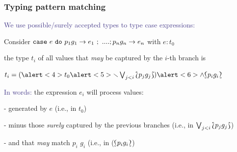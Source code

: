 \begin{frame}[fragile]
\frametitle{Typing pattern matching}

\vspace{.7pt}

\textcolor{darkslateblue}{We use possible/surely accepted types to type case expressions:}

\medskip

Consider \textcolor{typeBlue}{$\texttt{case}\,\, e \,\, \texttt{do} \,\, p_1g_1\to e_1 \,\, ; \,\, ....;p_ng_n\to e_n$} with \textcolor{typeBlue}{$e:t_0$}

\medskip
\pause
the type \textcolor{typeBlue}{$t_i$} of all values that \emph{may} be captured by the
$i$-th branch is

\centerline{\textcolor{typeBlue}{$t_i=(\alert<4>{t_0}\alert<5>{\setminus\bigvee_{j<i}\sAccType{p_jg_j}})\alert<6>{\wedge\pAccType{p_ig_i}}$}}

\medskip

\bigskip
\pause
\textcolor{darkslateblue}{In words:}
the expression \textcolor{typeBlue}{$e_i$} will process  values:

\pause
- generated by \textcolor{typeBlue}{$e$} (i.e., in $t_0$)

\pause

- \alert{minus} those \emph{surely} captured by the previous branches (i.e., in $\bigvee_{j<i}{\Lbag}p_jg_j{\Rbag}$)

\pause
- \alert{and} that \emph{may}  match \textcolor{typeBlue}{$p_i$\,\,$g_i$} (i.e.,
in ($\pAccType{p_ig_i}$)


\bigskip

\pause



\end{frame}
